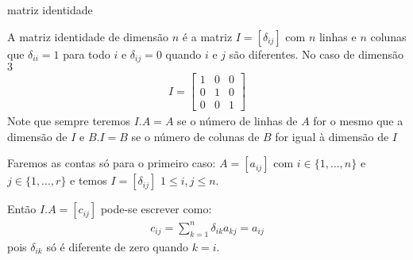 \documentclass{beamer}
\begin{document}
\begin{frame}{matriz identidade}

A matriz identidade de dimensão $n$ é a matriz $I =[\delta_{ij}]$ com $n$
linhas e $n$ colunas que $\delta_{ii} =1$ para todo $i$ e $\delta_{ij}=0$ quando
$i$ e $j$ são diferentes. No caso de dimensão $3$
\begin{gather*}
  I = \begin{bmatrix}
    1 & 0 & 0 \\ 0 & 1 & 0 \\ 0 & 0 & 1 
  \end{bmatrix}
\end{gather*}
   Note que sempre teremos $I.A= A$ se o número de linhas de $A$ for o mesmo que a dimensão de $I$ e
   $B.I=B$ se o número de colunas de $B$ for igual à dimensão de $I$

   Faremos as contas só para o primeiro caso:
   $A=[a_{ij}]$ com $i\in \{1,\dots,n\}$ e $j\in \{1,\dots, r\}$ e temos $I=[\delta_{ij}]$ $1 \leq i,j \leq n$.

   Então $I.A= [c_{ij}]$ pode-se escrever como:
   \begin{gather*}
     c_{ij} = \sum_{k=1}^n \delta_{ik}a_{kj} = a_{ij}
   \end{gather*}
   pois $\delta_{ik}$ só é diferente de zero quando $k=i$.

 \end{frame}

 \begin{frame}
   
 \end{frame}
\end{document}
